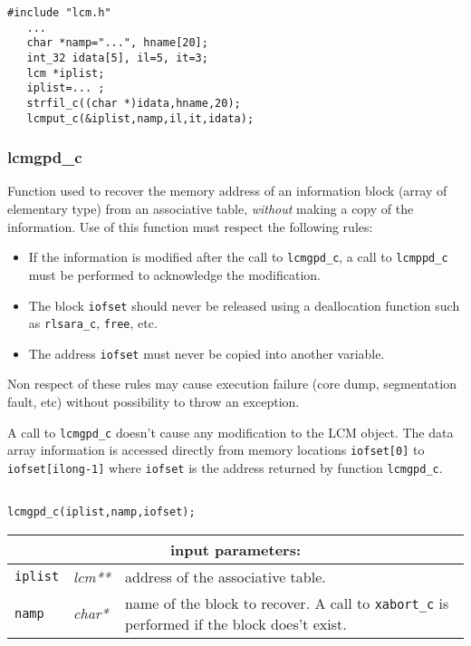 \begin{verbatim}
#include "lcm.h"
   ...
   char *namp="...", hname[20];
   int_32 idata[5], il=5, it=3;
   lcm *iplist;
   iplist=... ;
   strfil_c((char *)idata,hname,20);
   lcmput_c(&iplist,namp,il,it,idata);
\end{verbatim}

\subsubsection{lcmgpd\_c}

Function used to recover the memory address of an information block (array of elementary type) from an associative table,
{\sl without} making a copy of the information. Use of this function must respect the following rules:
\begin{itemize}
\item If the information is modified after the call to {\tt lcmgpd\_c}, a call to {\tt lcmppd\_c} 
must be performed to acknowledge the modification.
\item The block {\tt *iofset} should never be released using a deallocation function such as
{\tt rlsara\_c}, {\tt free}, etc.
\item The address {\tt iofset} must never be copied into another variable.
\end{itemize}
Non respect of these rules may cause execution failure (core dump,
segmentation fault, etc) without possibility to throw an exception.

\vskip 0.2cm

A call to {\tt lcmgpd\_c} doesn't cause any modification to the LCM object.
The data array information is accessed directly from memory locations {\tt *iofset[0]} to {\tt *iofset[ilong-1]}
where {\tt iofset} is the address returned by function {\tt lcmgpd\_c}.

\begin{verbatim}

lcmgpd_c(iplist,namp,iofset);
\end{verbatim}

\noindent
\begin{tabular}{|p{1.5cm}|p{2cm}|p{11cm}|}
\hline
\multicolumn{3}{|c|}{\bf input parameters:} \\
\hline
{\tt iplist} & {\it lcm**} & address of the associative table. \\
\hline
{\tt namp} & {\it char*} & name of the block to recover.
                                  A call to {\tt xabort\_c} is performed if the block does't exist. \\
\hline
\end{tabular}

